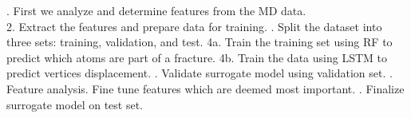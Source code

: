 \begin{itemize}
\begin{itemize}

. First we analyze and determine features from the MD data.
    \\
    2. Extract the features and prepare data for training. 
    . Split the dataset into three sets: training, validation, and test.
    \newline
    4a. Train the training set using RF to predict which atoms are part of a fracture.
    \newline
    4b. Train the data using LSTM to predict vertices displacement.
    . Validate surrogate model using validation set. 
    . Feature analysis. Fine tune features which are deemed most important. 
    . Finalize surrogate model on test set. 




\end{itemize}


\end{itemize}